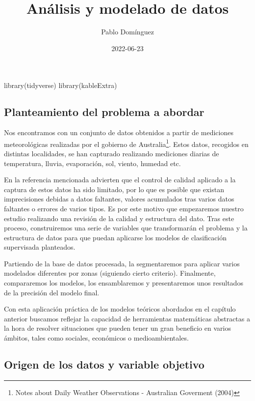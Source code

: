 \documentclass[
]{article}
\title{Análisis y modelado de datos}
\author{Pablo Domínguez}
\date{2022-06-23}
\newenvironment{Shaded}{\begin{snugshade}}{\end{snugshade}}
\newcommand{\FunctionTok}[1]{\textcolor[rgb]{0.00,0.00,0.00}{#1}}
\newcommand{\NormalTok}[1]{#1}
\begin{document}
\maketitle

\begin{Shaded}
\begin{Highlighting}[]
\FunctionTok{library}\NormalTok{(tidyverse)}
\FunctionTok{library}\NormalTok{(kableExtra)}
\end{Highlighting}
\end{Shaded}

\hypertarget{planteamiento-del-problema-a-abordar}{%
\subsection{Planteamiento del problema a
abordar}\label{planteamiento-del-problema-a-abordar}}

Nos encontramos con un conjunto de datos obtenidos a partir de
mediciones meteorológicas realizadas por el gobierno de
Australia\footnote{Notes about Daily Weather Observations - Australian
  Goverment (2004)}. Estos datos, recogidos en distintas localidades, se
han capturado realizando mediciones diarias de temperatura, lluvia,
evaporación, sol, viento, humedad etc.

En la referencia mencionada advierten que el control de calidad aplicado
a la captura de estos datos ha sido limitado, por lo que es posible que
existan imprecisiones debidas a datos faltantes, valores acumulados tras
varios datos faltantes o errores de varios tipos. Es por este motivo que
empezaremos nuestro estudio realizando una revisión de la calidad y
estructura del dato. Tras este proceso, construiremos una serie de
variables que transformarán el problema y la estructura de datos para
que puedan aplicarse los modelos de clasificación supervisada
planteados.

Partiendo de la base de datos procesada, la segmentaremos para aplicar
varios modelados diferentes por zonas (siguiendo cierto criterio).
Finalmente, compararemos los modelos, los ensamblaremos y presentaremos
unos resultados de la precisión del modelo final.

Con esta aplicación práctica de los modelos teóricos abordados en el
capítulo anterior buscamos reflejar la capacidad de herramientas
matemáticas abstractas a la hora de resolver situaciones que pueden
tener un gran beneficio en varios ámbitos, tales como sociales,
económicos o medioambientales.

\hypertarget{origen-de-los-datos-y-variable-objetivo}{%
\subsection{Origen de los datos y variable
objetivo}\label{origen-de-los-datos-y-variable-objetivo}}
\end{document}
